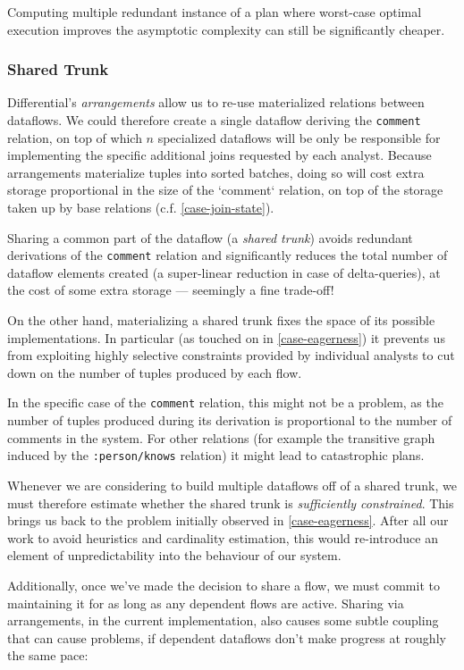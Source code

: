 \documentclass[../catalog.tex]{subfiles}
\begin{document}
Computing multiple redundant instance of a plan where worst-case
optimal execution improves the asymptotic complexity can still be
significantly cheaper.

\subsubsection{Shared Trunk}

Differential's \emph{arrangements} allow us to re-use materialized
relations between dataflows. We could therefore create a single
dataflow deriving the \texttt{comment} relation, on top of which $n$
specialized dataflows will be only be responsible for implementing the
specific additional joins requested by each analyst. Because
arrangements materialize tuples into sorted batches, doing so will
cost extra storage proportional in the size of the `comment` relation,
on top of the storage taken up by base relations
(c.f. \ref{case-join-state}).

Sharing a common part of the dataflow (a \emph{shared trunk}) avoids
redundant derivations of the \texttt{comment} relation and
significantly reduces the total number of dataflow elements created (a
super-linear reduction in case of delta-queries), at the cost of some
extra storage — seemingly a fine trade-off!

On the other hand, materializing a shared trunk fixes the space of its
possible implementations. In particular (as touched on in
\ref{case-eagerness}) it prevents us from exploiting highly selective
constraints provided by individual analysts to cut down on the number
of tuples produced by each flow.

In the specific case of the \texttt{comment} relation, this might not
be a problem, as the number of tuples produced during its derivation
is proportional to the number of comments in the system. For other
relations (for example the transitive graph induced by the
\texttt{:person/knows} relation) it might lead to catastrophic plans.

Whenever we are considering to build multiple dataflows off of a
shared trunk, we must therefore estimate whether the shared trunk is
\emph{sufficiently constrained}. This brings us back to the problem
initially observed in \ref{case-eagerness}. After all our work to
avoid heuristics and cardinality estimation, this would re-introduce
an element of unpredictability into the behaviour of our system.

Additionally, once we've made the decision to share a flow, we must
commit to maintaining it for as long as any dependent flows are
active. Sharing via arrangements, in the current implementation, also
causes some subtle coupling that can cause problems, if dependent
dataflows don't make progress at roughly the same pace:
\end{document}
